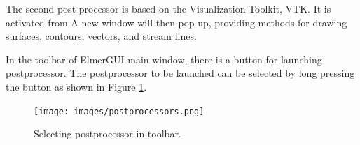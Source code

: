 The second post processor is based on the Visualization Toolkit, VTK. It is activated from
\noindent A new window will then pop up, providing methods for drawing surfaces, contours,
vectors, and stream lines.

In the toolbar of ElmerGUI main window, there is a button for launching postprocessor. The postprocessor to be launched can be selected by long pressing the button as shown in Figure \ref{fig:prostprocessors}.  
\begin{figure}[htb]
	\begin{center}
		\texttt{[image: images/postprocessors.png]}
		\caption{Selecting postprocessor in toolbar.}
		\label{fig:prostprocessors}
	\end{center}
\end{figure}


